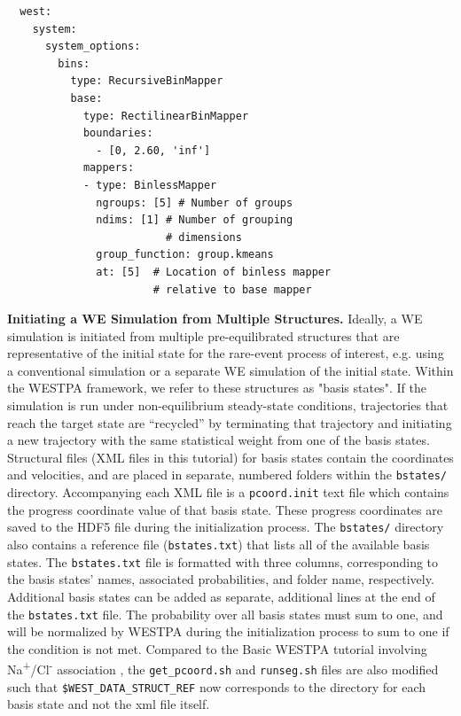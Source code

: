 \begin{verbatim}
  west:
    system:
      system_options:
        bins:
          type: RecursiveBinMapper
          base:
            type: RectilinearBinMapper
            boundaries:
              - [0, 2.60, 'inf']
            mappers:
            - type: BinlessMapper
              ngroups: [5] # Number of groups
              ndims: [1] # Number of grouping 
                         # dimensions
              group_function: group.kmeans
              at: [5]  # Location of binless mapper
                       # relative to base mapper
\end{verbatim} 

\textbf{Initiating a WE Simulation from Multiple Structures.} Ideally, a WE simulation is initiated from multiple pre-equilibrated structures that are representative of the initial state for the rare-event process of interest, e.g. using a conventional simulation or a separate WE simulation of the initial state.
Within the WESTPA framework, we refer to these structures as "basis states". 
If the simulation is run under non-equilibrium steady-state conditions, trajectories that reach the target state are “recycled” by terminating that trajectory and initiating a new trajectory with the same statistical weight from one of the basis states. 
Structural files (XML files in this tutorial) for basis states contain the coordinates and velocities, and are placed in separate, numbered folders within the \verb|bstates/| directory. 
Accompanying each XML file is a \verb|pcoord.init| text file which contains the progress coordinate value of that basis state. 
These progress coordinates are saved to the HDF5 file during the initialization process. 
The \verb|bstates/| directory also contains a reference file (\verb|bstates.txt|) that lists all of the available basis states. 
The \verb|bstates.txt| file is formatted with three columns, corresponding to the basis states’ names, associated probabilities, and folder name, respectively.
Additional basis states can be added as separate, additional lines at the end of the \verb|bstates.txt| file. 
The probability over all basis states must sum to one, and will be normalized by WESTPA during the initialization process to sum to one if the condition is not met.
Compared to the Basic WESTPA tutorial involving Na\textsuperscript{+}/Cl\textsuperscript{-} association \citep{bogetti_suite_2019}, the \verb|get_pcoord.sh| and \verb|runseg.sh| files are also modified such that \verb|$WEST_DATA_STRUCT_REF| now corresponds to the directory for each basis state and not the xml file itself.

